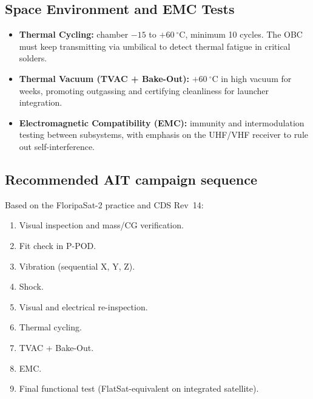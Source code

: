 \subsection{Space Environment and EMC Tests}
\begin{itemize}
    \item \textbf{Thermal Cycling:} chamber $-15$ to $+60\ ^\circ$C, minimum 10 cycles. The OBC must keep transmitting via umbilical to detect thermal fatigue in critical solders.

    \item \textbf{Thermal Vacuum (TVAC + Bake-Out):} $+60\ ^\circ$C in high vacuum for weeks, promoting outgassing and certifying cleanliness for launcher integration.

    \item \textbf{Electromagnetic Compatibility (EMC):} immunity and intermodulation testing between subsystems, with emphasis on the UHF/VHF receiver to rule out self-interference.
\end{itemize}

\subsection{Recommended AIT campaign sequence}
Based on the FloripaSat-2 practice and CDS Rev~14:
\begin{enumerate}
    \item Visual inspection and mass/CG verification.
    \item Fit check in P-POD.
    \item Vibration (sequential X, Y, Z).
    \item Shock.
    \item Visual and electrical re-inspection.
    \item Thermal cycling.
    \item TVAC + Bake-Out.
    \item EMC.
    \item Final functional test (FlatSat-equivalent on integrated satellite).
\end{enumerate}
